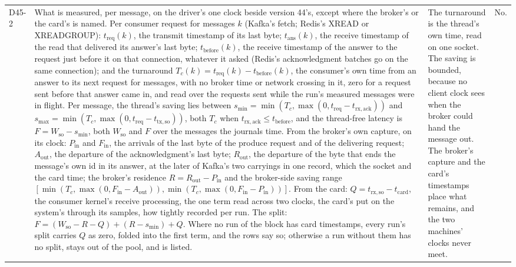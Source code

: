 \documentclass[11pt]{article}
\begin{document}
{\begin{longtable}{@{}p{1.1cm} >{\raggedright\arraybackslash}p{6.1cm} >{\raggedright\arraybackslash}p{6.0cm} >{\raggedright\arraybackslash}p{2.2cm}@{}}
D45-2 & What is measured, per message, on the driver's one clock beside version 44's, except where the broker's or the card's is named. Per consumer request for messages $k$ (Kafka's fetch; Redis's XREAD or XREADGROUP): $t_{\mathrm{req}}(k)$, the transmit timestamp of its last byte; $t_{\mathrm{ans}}(k)$, the receive timestamp of the read that delivered its answer's last byte; $t_{\mathrm{before}}(k)$, the receive timestamp of the answer to the request just before it on that connection, whatever it asked (Redis's acknowledgment batches go on the same connection); and the turnaround $T_c(k) = t_{\mathrm{req}}(k) - t_{\mathrm{before}}(k)$, the consumer's own time from an answer to its next request for messages, with no broker time or network crossing in it, zero for a request sent before that answer came in, and read over the requests sent while the run's measured messages were in flight. Per message, the thread's saving lies between $s_{\min} = \min(T_c, \max(0, t_{\mathrm{req}} - t_{\mathrm{rx,ack}}))$ and $s_{\max} = \min(T_c, \max(0, t_{\mathrm{req}} - t_{\mathrm{tx,so}}))$, both $T_c$ when $t_{\mathrm{rx,ack}} \le t_{\mathrm{before}}$, and the thread-free latency is $F = W_{\mathrm{so}} - s_{\min}$, both $W_{\mathrm{so}}$ and $F$ over the messages the journals time. From the broker's own capture, on its clock: $P_{\mathrm{in}}$ and $F_{\mathrm{in}}$, the arrivals of the last byte of the produce request and of the delivering request; $A_{\mathrm{out}}$, the departure of the acknowledgment's last byte; $R_{\mathrm{out}}$, the departure of the byte that ends the message's own id in its answer, at the later of Kafka's two carryings in one record, which the socket and the card time; the broker's residence $R = R_{\mathrm{out}} - P_{\mathrm{in}}$ and the broker-side saving range $[\min(T_c, \max(0, F_{\mathrm{in}} - A_{\mathrm{out}})), \min(T_c, \max(0, F_{\mathrm{in}} - P_{\mathrm{in}}))]$. From the card: $Q = t_{\mathrm{rx,so}} - t_{\mathrm{card}}$, the consumer kernel's receive processing, the one term read across two clocks, the card's put on the system's through its samples, how tightly recorded per run. The split: $F = (W_{\mathrm{so}} - R - Q) + (R - s_{\min}) + Q$. Where no run of the block has card timestamps, every run's split carries $Q$ as zero, folded into the first term, and the rows say so; otherwise a run without them has no split, stays out of the pool, and is listed. & The turnaround is the thread's own time, read on one socket. The saving is bounded, because no client clock sees when the broker could hand the message out. The broker's capture and the card's timestamps place what remains, and the two machines' clocks never meet. & No. \\

\end{longtable}}
\end{document}
